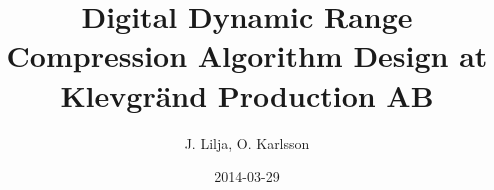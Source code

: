 \documentclass[]{article}
\begin{document}
\newcommand{\rootdir}{.}

\title{Digital Dynamic Range Compression Algorithm Design at Klevgränd Production AB}
\author{J. Lilja, O. Karlsson}
\date{2014-03-29}
\maketitle

\begin{abstract}
\end{abstract}
\clearpage

\tableofcontents
\clearpage















\end{document}
